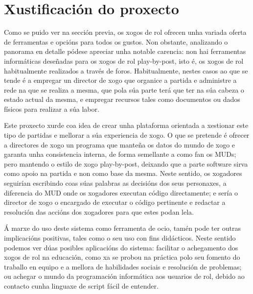 \section{Xustificación do proxecto}
Como se puido ver na sección previa, os xogos de rol ofrecen unha variada oferta
de ferramentas e opcións para todos os gustos. Non obstante, analizando o
panorama en detalle pódese apreciar unha notable carencia: non hai ferramentas
informáticas deseñadas para os xogos de rol play-by-post, isto é, os xogos de
rol habitualmente realizados a través de foros. Habitualmente, nestes casos ao
que se tende é a empregar un director de xogo que organice a partida e
administre a rede na que se realiza a mesma, que pola súa parte terá que ter na
súa cabeza o estado actual da mesma, e empregar recursos tales como documentos
ou dados físicos para realizar a súa labor.
\par
Este proxecto xurde coa idea de crear unha plataforma orientada a xestionar este
tipo de partidas e mellorar a súa experiencia de xogo. O que se pretende é
ofrecer a directores de xogo un programa que manteña os datos do mundo de xogo e
garanta unha consistencia interna, de forma semellante a como fan os MUDs; pero
mantendo o estilo de xogo play-by-post, deixando que a parte software sirva como
apoio na partida e non como base da mesma. Neste sentido, os xogadores seguirían
escribindo coas súas palabras as decisións dos seus personaxes, a diferencia do
MUD onde os xogadores executan código directamente; e sería o director de xogo o
encargado de executar o código pertinente e redactar a resolución das accións
dos xogadores para que estes podan lela.
\par
Á marxe do uso deste sistema como ferramenta de ocio, tamén pode ter outras
implicacións positivas, tales como o seu uso con fins didácticos. Neste sentido
podemos ver dúas posibles aplicacións do sistema: facilitar o achegamento dos
xogos de rol na educación, como xa se probou na práctica \cite{rpgensino} polo
seu fomento do traballo en equipo e a mellora de habilidades sociais e
resolución de problemas; ou achegar o mundo da programación informática aos
usuarios de rol, debido ao contacto cunha linguaxe de script fácil de entender.

